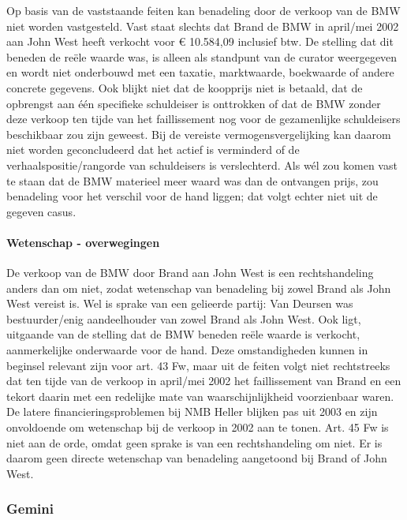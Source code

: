 \documentclass[
  dutch,
  a4paper,
]{article}
\begin{document}
Op basis van de vaststaande feiten kan benadeling door de verkoop van de BMW niet worden vastgesteld. Vast staat slechts dat Brand de BMW in april/mei 2002 aan John West heeft verkocht voor € 10.584,09 inclusief btw. De stelling dat dit beneden de reële waarde was, is alleen als standpunt van de curator weergegeven en wordt niet onderbouwd met een taxatie, marktwaarde, boekwaarde of andere concrete gegevens. Ook blijkt niet dat de koopprijs niet is betaald, dat de opbrengst aan één specifieke schuldeiser is onttrokken of dat de BMW zonder deze verkoop ten tijde van het faillissement nog voor de gezamenlijke schuldeisers beschikbaar zou zijn geweest. Bij de vereiste vermogensvergelijking kan daarom niet worden geconcludeerd dat het actief is verminderd of de verhaalspositie/rangorde van schuldeisers is verslechterd. Als wél zou komen vast te staan dat de BMW materieel meer waard was dan de ontvangen prijs, zou benadeling voor het verschil voor de hand liggen; dat volgt echter niet uit de gegeven casus.

\paragraph{Wetenschap - overwegingen}\label{wetenschap---overwegingen-58}

De verkoop van de BMW door Brand aan John West is een rechtshandeling anders dan om niet, zodat wetenschap van benadeling bij zowel Brand als John West vereist is. Wel is sprake van een gelieerde partij: Van Deursen was bestuurder/enig aandeelhouder van zowel Brand als John West. Ook ligt, uitgaande van de stelling dat de BMW beneden reële waarde is verkocht, aanmerkelijke onderwaarde voor de hand. Deze omstandigheden kunnen in beginsel relevant zijn voor art. 43 Fw, maar uit de feiten volgt niet rechtstreeks dat ten tijde van de verkoop in april/mei 2002 het faillissement van Brand en een tekort daarin met een redelijke mate van waarschijnlijkheid voorzienbaar waren. De latere financieringsproblemen bij NMB Heller blijken pas uit 2003 en zijn onvoldoende om wetenschap bij de verkoop in 2002 aan te tonen. Art. 45 Fw is niet aan de orde, omdat geen sprake is van een rechtshandeling om niet. Er is daarom geen directe wetenschap van benadeling aangetoond bij Brand of John West.

\newpage


\subsubsection{Gemini}\label{gemini-19}
\end{document}
